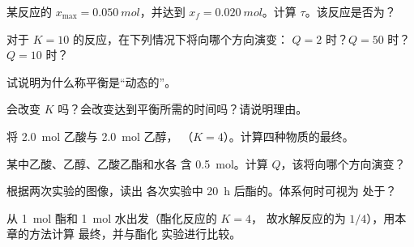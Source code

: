\begin{exercise}[$\star$]\label{exo:g12:equilibrium:2}
某反应的 $x_{\max} = \qty{0.050}{mol}$，并达到
$x_f = \qty{0.020}{mol}$。计算 $\tau$。该反应是否为？
\end{exercise}

\begin{exercise}[$\star$]\label{exo:g12:equilibrium:3}
对于 $K = 10$ 的反应，在下列情况下将向哪个方向演变：
$Q = 2$ 时？$Q = 50$ 时？$Q = 10$ 时？
\end{exercise}

\begin{exercise}[$\star$]\label{exo:g12:equilibrium:4}
试说明为什么称平衡是“动态的”。
\end{exercise}

\begin{exercise}[$\star$]\label{exo:g12:equilibrium:5}
会改变 $K$ 吗？会改变达到平衡所需的时间吗？请说明理由。
\end{exercise}

\begin{exercise}[$\star\star$]\label{exo:g12:equilibrium:6}
将 \qty{2.0}{mol} 乙酸与 \qty{2.0}{mol} 乙醇，
（$K = 4$）。计算四种物质的最终。
\end{exercise}

\begin{exercise}[$\star\star$]\label{exo:g12:equilibrium:7}
某中乙酸、乙醇、乙酸乙酯和水各
含 \qty{0.5}{mol}。计算 $Q$，该将向哪个方向演变？
\end{exercise}

\begin{exercise}[$\star\star$]\label{exo:g12:equilibrium:8}
根据两次实验的图像，读出
各次实验中 \qty{20}{h} 后酯的。体系何时可视为
处于？
\end{exercise}

\begin{exercise}[$\star\star$]\label{exo:g12:equilibrium:9}
从 \qty{1}{mol} 酯和 \qty{1}{mol} 水出发（酯化反应的 $K = 4$，
故水解反应的为 $1/4$），用本章的方法计算
最终，并与酯化
实验进行比较。
\end{exercise}

